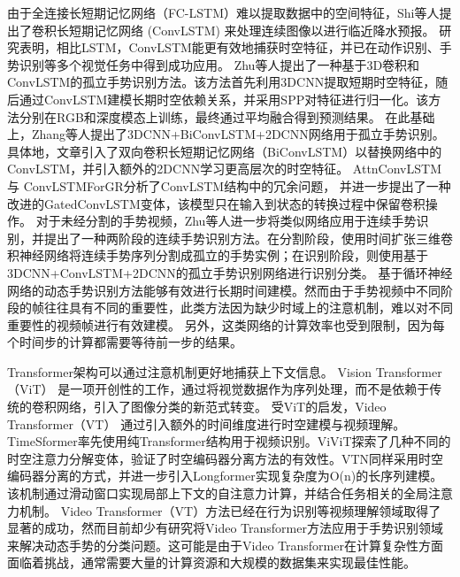 由于全连接长短期记忆网络（FC-LSTM）难以提取数据中的空间特征，Shi等人\cite{shi2015convlstm}提出了卷积长短期记忆网络 (ConvLSTM) 来处理连续图像以进行临近降水预报。
研究表明，相比LSTM，ConvLSTM能更有效地捕获时空特征，并已在动作识别、手势识别等多个视觉任务中得到成功应用。
Zhu等人\cite{zhu2017multimodal}提出了一种基于3D卷积和ConvLSTM的孤立手势识别方法。该方法首先利用3DCNN提取短期时空特征，随后通过ConvLSTM建模长期时空依赖关系，并采用SPP\cite{he2015spatial}对特征进行归一化。该方法分别在RGB和深度模态上训练，最终通过平均融合得到预测结果。
在此基础上，Zhang等人\cite{zhang2017learning}提出了3DCNN+BiConvLSTM+2DCNN网络用于孤立手势识别。具体地，文章引入了双向卷积长短期记忆网络（BiConvLSTM）以替换网络中的ConvLSTM，并引入额外的2DCNN学习更高层次的时空特征。
AttnConvLSTM\cite{zhang2018attention}与
ConvLSTMForGR\cite{zhu2019redundancy}分析了ConvLSTM结构中的冗余问题，
并进一步提出了一种改进的GatedConvLSTM变体，该模型只在输入到状态的转换过程中保留卷积操作。
对于未经分割的手势视频，Zhu等人\cite{zhu2018continuous}进一步将类似网络应用于连续手势识别，并提出了一种两阶段的连续手势识别方法。在分割阶段，使用时间扩张三维卷积神经网络将连续手势序列分割成孤立的手势实例；在识别阶段，则使用基于3DCNN+ConvLSTM+2DCNN的孤立手势识别网络进行识别分类。
基于循环神经网络的动态手势识别方法能够有效进行长期时间建模。然而由于手势视频中不同阶段的帧往往具有不同的重要性\cite{lin2018large}，此类方法因为缺少时域上的注意机制，难以对不同重要性的视频帧进行有效建模。
另外，这类网络的计算效率也受到限制，因为每个时间步的计算都需要等待前一步的结果。

Transformer架构\cite{vaswani2017attention}可以通过注意机制更好地捕获上下文信息。
Vision Transformer（ViT） \cite{vit2021image}是一项开创性的工作，通过将视觉数据作为序列处理，而不是依赖于传统的卷积网络，引入了图像分类的新范式转变。
受ViT的启发，Video Transformer（VT）\cite{selva2023video} 通过引入额外的时间维度进行时空建模与视频理解。
TimeSformer\cite{bertasius2021space}率先使用纯Transformer结构用于视频识别。ViViT\cite{arnab2021vivit}探索了几种不同的时空注意力分解变体，验证了时空编码器分离方法的有效性。VTN\cite{neimark2021video}同样采用时空编码器分离的方式，并进一步引入Longformer实现复杂度为O(n)的长序列建模。
该机制通过滑动窗口实现局部上下文的自注意力计算，并结合任务相关的全局注意力机制。
Video Transformer（VT）方法已经在行为识别等视频理解领域取得了显著的成功，然而目前却少有研究将Video Transformer方法应用于手势识别领域来解决动态手势的分类问题。这可能是由于Video Transformer在计算复杂性方面面临着挑战，通常需要大量的计算资源和大规模的数据集来实现最佳性能\cite{khan2022transformers}。

